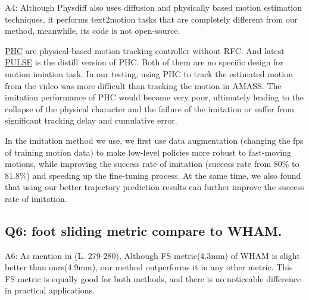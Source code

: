 \documentclass{article}
\begin{document}
A4: Although Physdiff also uses diffusion and physically based motion estimation techniques, it performs text2motion tasks that are completely different from our method, meanwhile, its code is not open-source.

\href{https://github.com/ZhengyiLuo/PHC}{PHC} are physical-based motion tracking controller without RFC. And latest \href{https://github.com/ZhengyiLuo/PULSE}{PULSE} is the distill version of PHC. Both of them are no specific design for motion imiation task. In our testing, using PHC to track the estimated motion from the video was more difficult than tracking the motion in AMASS. The imitation performance of PHC would become very poor, ultimately leading to the collapse of the physical character and the failure of the imitation or suffer from significant tracking delay and cumulative error.

In the imitation method we use, we first use data augmentation (changing the fps of training motion data) to make low-level policies more robust to fast-moving motions, while improving the success rate of imitation (success rate from 80\% to 81.8\%) and speeding up the fine-tuning process. At the same time, we also found that using our better trajectory prediction results can further improve the success rate of imitation. 


\subsection{Q6: foot sliding metric compare to WHAM.}\label{q6-foot-sliding-metric-compare-to-wham.}

A6: As mention in (L. 279-280), Although FS metric(4.3mm) of WHAM is slight better than ours(4.9mm), our method outperforms it in any other metric. This FS metric is equally good for both methods, and there is no noticeable difference in practical applications.




\end{document}
